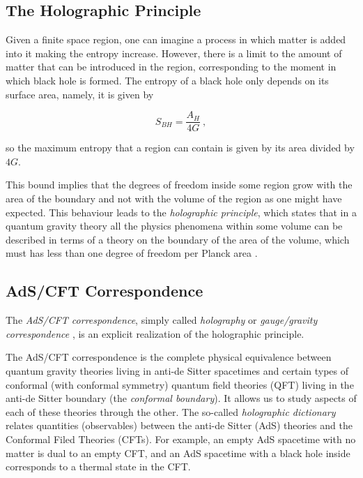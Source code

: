 \documentclass[twocolumn]{revtex4}
\providecommand{\eq}[2]{
    \begin{equation}
        #2
    \label{eq:#1}
    \end{equation}
}
\begin{document}
\subsection{The Holographic Principle} \label{ss:Holography}

Given a finite space region, one can imagine a process in which matter is added into it making the entropy increase. However, there is a limit to the amount of matter that can be introduced in the region, corresponding to the moment in which black hole is formed. The entropy of a black hole only depends on its surface area, namely, it is given by
\eq{BH}{
    S_{BH} = \frac{ A_H }{ 4 G } \ ,
}
\cite{bekenstein_black_1973} so the maximum entropy that a region can contain is given by its area divided by $4G$.

This bound implies that the degrees of freedom inside some region grow with the area of the boundary and not with the volume of the region as one might have expected. This behaviour leads to the \textit{holographic principle}, which states that in a quantum gravity theory all the physics phenomena within some volume can be described in terms of a theory on the boundary of the area of the volume, which must has less than one degree of freedom per Planck area \cite{t_hooft_dimensional_2009}.


\subsection{AdS/CFT Correspondence} \label{ss:AdS/CFT}

The \textit{AdS/CFT correspondence}, simply called \textit{holography} or \textit{gauge/gravity correspondence} \cite{maldacena_large_1999, witten_anti_1998}, is an explicit realization of the holographic principle.

The AdS/CFT correspondence is the complete physical equivalence between quantum gravity theories living in anti-de Sitter spacetimes and certain types of conformal (with conformal symmetry) quantum field theories (QFT) living in the anti-de Sitter boundary (the \textit{conformal boundary}). It allows us to study aspects of each of these theories through the other. The so-called \textit{holographic dictionary} relates quantities (observables) between the anti-de Sitter (AdS) theories and the Conformal Filed Theories (CFTs). For example, an empty AdS spacetime with no matter is dual to an empty CFT, and an AdS spacetime with a black hole inside corresponds to a thermal state in the CFT.
\end{document}
